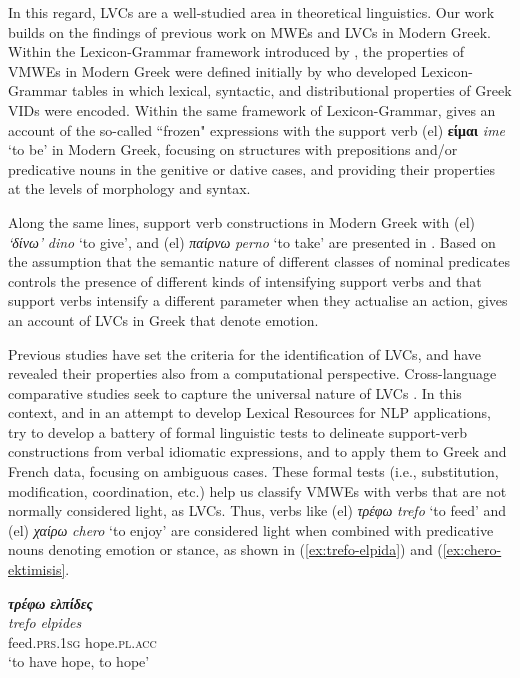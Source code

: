 \documentclass[output=paper,colorlinks,citecolor=brown]{langscibook}
\begin{document}
In this regard, LVCs are a well-studied area in theoretical linguistics. Our work builds on the findings of previous work on MWEs and LVCs in Modern Greek. Within the Lexicon-Grammar framework introduced by \citet{gross_methodes_1975}, the properties of VMWEs in Modern Greek were defined initially by \citet{Fotopoulou1993} who developed Lexicon-Grammar tables in which lexical, syntactic, and distributional properties of Greek VIDs were encoded. Within the same framework of Lexicon-Grammar, \citet{moustaki1995} gives an account of the so-called ``frozen" expressions with the support verb (el) \textbf{είμαι} \textit{ime} `to be' in Modern Greek, focusing on structures with prepositions and/or predicative nouns in the genitive or dative cases, and providing their properties at the levels of morphology and syntax.


Along the same lines, support verb constructions in Modern Greek with (el) \textit{`δίνω'} \textit{dino} `to give', and (el) \textit{παίρνω} \textit{perno} `to take' are presented in \citet{tsolaki-1998}.
Based on the assumption that the semantic nature of different classes of nominal predicates controls the presence of different kinds of intensifying support verbs and that support verbs intensify a different parameter when they actualise an action, \citet{gav-2004} gives an account of LVCs in Greek that denote emotion.

Previous studies have set the criteria for the identification of LVCs, and have revealed their properties \citep{sklavounou-1994, sfetsiou-2007} also from a computational perspective. Cross-language comparative studies seek to capture the universal nature of LVCs \citep{fotopoulou-giouli-2018}. In this context, and in an attempt to develop Lexical Resources for NLP applications, \citet{Fotopoulou-Giouli-2015} try to develop a battery of formal linguistic tests to delineate support-verb constructions from verbal idiomatic expressions, and to apply them to Greek and French data, focusing on ambiguous cases. These formal tests (i.e., substitution, modification, coordination, etc.) help us classify VMWEs with verbs that are not normally considered light, as LVCs. Thus, verbs like (el) \textit{τρέφω} \textit{trefo} `to feed' and (el) \textit{χαίρω} \textit{chero} `to enjoy' are considered light when combined with predicative nouns denoting emotion or stance, as shown in (\ref{ex:trefo-elpida}) and (\ref{ex:chero-ektimisis}.


\ea
\label{ex:trefo-elpida}
\settowidth {}
\glll
\textbf{\em{τρέφω}} \textbf{\em{ελπίδες}} \\
\textit{trefo} \textit{elpides} \\
feed.\textsc{prs.1sg} hope.\textsc{pl.acc} \\
\glt ‘to have hope, to hope’
\z
\end{document}

